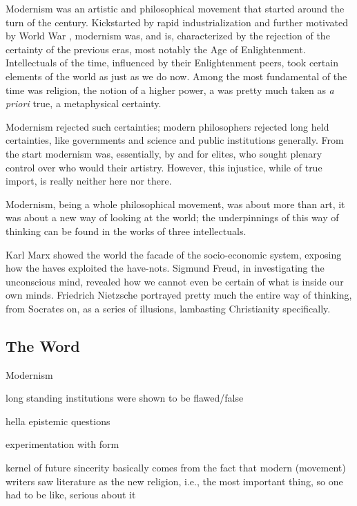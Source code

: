 \documentclass[../butidigress.tex]{subfiles}
\newcounter{worldwarcounter}\setcounter{worldwarcounter}{1}
\begin{document}
Modernism was an artistic and philosophical movement that started around the turn of the  century.
Kickstarted by rapid industrialization and further motivated by World War , modernism was, and is, characterized by the rejection of the certainty of the previous eras, most notably the Age of Enlightenment.
Intellectuals of the time, influenced by their Enlightenment peers, took certain elements of the world as  just as we do now.
Among the most fundamental of the time was religion, the notion of a higher power, a  was pretty much taken as \textit{a priori} true, a metaphysical certainty.

Modernism rejected such certainties; modern philosophers rejected long held certainties, like governments and science and public institutions generally.
From the start modernism was, essentially, by and for elites\autocite[2]{cambridgemodern}, who sought plenary control over who would  their artistry.
However, this injustice, while of true import, is really neither here nor there.

Modernism, being a whole philosophical movement, was about more than art, it was about a new way of looking at the world; the underpinnings of this way of thinking can be found in the works of three intellectuals\autocite[9]{cambridgemodern}.

Karl Marx showed the world the facade of the socio-economic system, exposing how the haves exploited the have-nots.
Sigmund Freud, in investigating the unconscious mind, revealed how we cannot even be certain of what is inside our own minds.
Friedrich Nietzsche portrayed pretty much the entire  way of thinking, from Socrates on, as a series of illusions, lambasting Christianity specifically.

\subsection{The Word }


\begin{somenotes}{Modernism}
    \item long standing institutions were shown to be flawed/false
    \item hella epistemic questions
    \item experimentation with form
    \item kernel of future sincerity basically comes from the fact that modern (movement) writers saw literature as the new religion, i.e., the most important thing, so one had to be like, serious about it
\end{somenotes}
\end{document}
